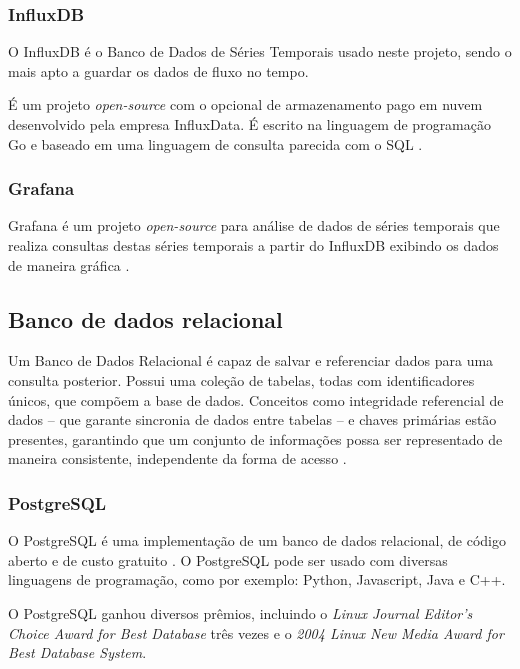 \subsubsection{InfluxDB}

O InfluxDB é o Banco de Dados de Séries Temporais usado neste projeto, sendo o mais apto a guardar os dados de fluxo no tempo. \cite{Lundrigan2017}

É um projeto \textit{open-source} com o opcional de armazenamento pago em nuvem desenvolvido pela empresa InfluxData. É escrito na linguagem de programação Go e baseado em uma linguagem de consulta parecida com o SQL \cite{Noor2017}.

\subsubsection{Grafana}

Grafana é um projeto \textit{open-source} para análise de dados de séries temporais  \cite{Noor2017} que realiza consultas destas séries temporais a partir do InfluxDB exibindo os dados de maneira gráfica \cite{chang2017kubernetes}.

\subsection{Banco de dados relacional}

Um Banco de Dados Relacional é capaz de salvar e referenciar dados para uma consulta posterior. Possui uma coleção de tabelas, todas com identificadores únicos, que compõem a base de
dados. Conceitos como integridade referencial de dados – que garante sincronia de dados entre tabelas – e chaves primárias estão presentes, garantindo que um conjunto de informações possa ser representado de maneira consistente, independente da forma de acesso  \cite{bancosrelacionais}.

\subsubsection{PostgreSQL}

O PostgreSQL é uma implementação de um banco de dados relacional, de código aberto e de custo gratuito \cite{stones2006beginning}. O 
PostgreSQL pode ser usado com diversas linguagens de programação, como por exemplo: Python, Javascript, Java e C++.

O PostgreSQL ganhou diversos prêmios, incluindo o \textit{Linux Journal Editor's Choice Award for Best Database} três vezes e o \textit{2004 Linux New Media Award for Best Database System}.

